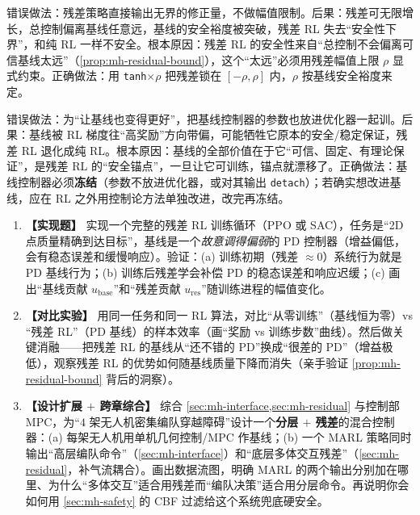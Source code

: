 \begin{pitfall}
错误做法：残差策略直接输出无界的修正量，不做幅值限制。后果：残差可无限增长，总控制偏离基线任意远，基线的安全裕度被突破，残差 RL 失去“安全性下界”，和纯 RL 一样不安全。根本原因：残差 RL 的安全性来自“总控制不会偏离可信基线太远”（\cref{prop:mh-residual-bound}），这个“太远”必须用残差幅值上限 $\rho$ 显式约束。正确做法：用 \texttt{tanh}$\times\rho$ 把残差锁在 $[-\rho,\rho]$ 内，$\rho$ 按基线安全裕度来定。
\end{pitfall}

\begin{pitfall}
错误做法：为“让基线也变得更好”，把基线控制器的参数也放进优化器一起训。后果：基线被 RL 梯度往“高奖励”方向带偏，可能牺牲它原本的安全/稳定保证，残差 RL 退化成纯 RL。根本原因：基线的全部价值在于它“可信、固定、有理论保证”，是残差 RL 的“安全锚点”，一旦让它可训练，锚点就漂移了。正确做法：基线控制器必须\textbf{冻结}（参数不放进优化器，或对其输出 \texttt{detach}）；若确实想改进基线，应在 RL 之外用控制论方法单独改进，改完再冻结。
\end{pitfall}

\begin{practice}
\begin{enumerate}
  \item \textbf{【实现题】} 实现一个完整的残差 RL 训练循环（PPO 或 SAC），任务是“2D 点质量精确到达目标”，基线是一个\emph{故意调得偏弱}的 PD 控制器（增益偏低，会有稳态误差和缓慢响应）。验证：(a) 训练初期（残差 $\approx0$）系统行为就是 PD 基线行为；(b) 训练后残差学会补偿 PD 的稳态误差和响应迟缓；(c) 画出“基线贡献 $u_{\text{base}}$”和“残差贡献 $u_{\text{res}}$”随训练进程的幅值变化。
  \item \textbf{【对比实验】} 用同一任务和同一 RL 算法，对比“从零训练”（基线恒为零）vs “残差 RL”（PD 基线）的样本效率（画“奖励 vs 训练步数”曲线）。然后做关键消融——把残差 RL 的基线从“还不错的 PD”换成“很差的 PD”（增益极低），观察残差 RL 的优势如何随基线质量下降而消失（亲手验证 \cref{prop:mh-residual-bound} 背后的洞察）。
  \item \textbf{【设计扩展 $+$ 跨章综合】} 综合 \cref{sec:mh-interface,sec:mh-residual} 与控制部 MPC，为“$4$ 架无人机密集编队穿越障碍”设计一个\textbf{分层 $+$ 残差}的混合控制器：(a) 每架无人机用单机几何控制/MPC 作基线；(b) 一个 MARL 策略同时输出“高层编队命令”（\cref{sec:mh-interface}）和“底层多体交互残差”（\cref{sec:mh-residual}，补气流耦合）。画出数据流图，明确 MARL 的两个输出分别加在哪里、为什么“多体交互”适合用残差而“编队决策”适合用分层命令。再说明你会如何用 \cref{sec:mh-safety} 的 CBF 过滤给这个系统兜底硬安全。
\end{enumerate}
\end{practice}

